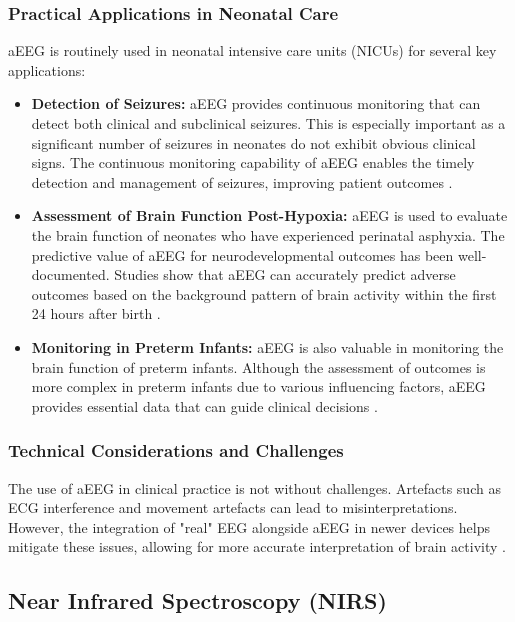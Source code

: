 \documentclass[12pt,journal,compsoc]{IEEEtran}
\begin{document}
\subsubsection{Practical Applications in Neonatal Care}
aEEG is routinely used in neonatal intensive care units (NICUs) for several key applications:

\begin{itemize}
    \item \textbf{Detection of Seizures:} aEEG provides continuous monitoring that can detect both clinical and subclinical seizures. This is especially important as a significant number of seizures in neonates do not exhibit obvious clinical signs. The continuous monitoring capability of aEEG enables the timely detection and management of seizures, improving patient outcomes \cite{IEEEhowto:toet}.
    \item \textbf{Assessment of Brain Function Post-Hypoxia:} aEEG is used to evaluate the brain function of neonates who have experienced perinatal asphyxia. The predictive value of aEEG for neurodevelopmental outcomes has been well-documented. Studies show that aEEG can accurately predict adverse outcomes based on the background pattern of brain activity within the first 24 hours after birth \cite{IEEEhowto:toet}.
    \item \textbf{Monitoring in Preterm Infants:} aEEG is also valuable in monitoring the brain function of preterm infants. Although the assessment of outcomes is more complex in preterm infants due to various influencing factors, aEEG provides essential data that can guide clinical decisions \cite{IEEEhowto:toet}.
\end{itemize}

\subsubsection{Technical Considerations and Challenges}
The use of aEEG in clinical practice is not without challenges. Artefacts such as ECG interference and movement artefacts can lead to misinterpretations. However, the integration of "real" EEG alongside aEEG in newer devices helps mitigate these issues, allowing for more accurate interpretation of brain activity \cite{IEEEhowto:toet}.

\subsection{Near Infrared Spectroscopy (NIRS)}
\end{document}
